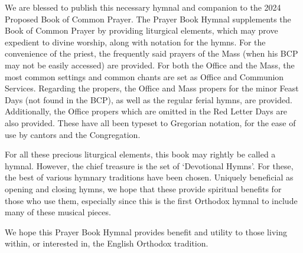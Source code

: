 {}
\noindent
We are blessed to publish this necessary hymnal and companion to the 2024 Proposed Book of Common Prayer. The Prayer Book Hymnal supplements the Book of Common Prayer by providing liturgical elements, which may prove expedient to divine worship, along with notation for the hymns. For the convenience of the priest, the frequently said prayers of the Mass (when his BCP may not be easily accessed) are provided. For both the Office and the Mass, the most common settings and common chants are set as Office and Communion Services. Regarding the propers, the Office and Mass propers for the minor Feast Days (not found in the BCP), as well as the regular ferial hymns, are provided. Additionally, the Office propers which are omitted in the Red Letter Days are also provided. These have all been typeset to Gregorian notation, for the ease of use by cantors and the Congregation.

For all these precious liturgical elements, this book may rightly be called a hymnal. However, the chief treasure is the set of `Devotional Hymns'. For these, the best of various hymnary traditions have been chosen. Uniquely beneficial as opening and closing hymns, we hope that these provide spiritual benefits for those who use them, especially since this is the first Orthodox hymnal to include many of these musical pieces.

We hope this Prayer Book Hymnal provides benefit and utility to those living within, or interested in, the English Orthodox tradition.